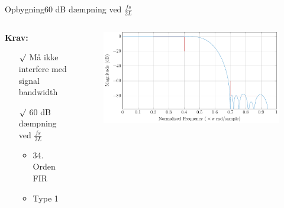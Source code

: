 \begin{frame}{Opbygning}{60 dB dæmpning ved $\frac{fs}{2L}$}
\begin{columns}
  \begin{column}{0.4\textwidth}
\textbf{Krav:}
\begin{itemize}
\item[$\surd$] Må ikke interfere med signal bandwidth
\item[$\surd$] 60 dB dæmpning ved $\frac{fs}{2L}$
\begin{itemize}
\item 34. Orden FIR
\item Type 1
\end{itemize}
\end{itemize}
  \end{column}
  \begin{column}{0.6\textwidth}
\begin{figure}
	\centering
	\includegraphics[width=1\textwidth]{IntMag}
\end{figure}
  \end{column}
\end{columns}
\end{frame}


